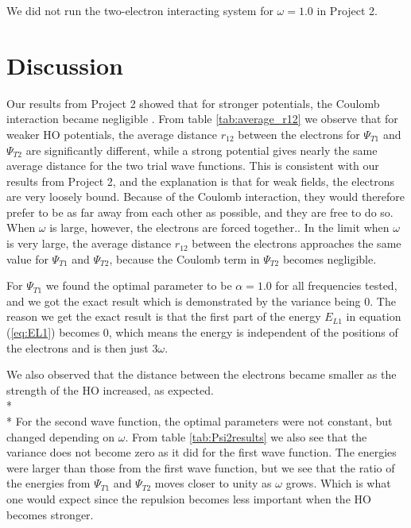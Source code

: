 \documentclass[norsk,a4paper,12pt]{article}
\begin{document}
We did not run the two-electron interacting system for $\omega = 1.0$ in Project 2.

\section{Discussion} \label{Discussion}
Our results from Project 2 showed that for stronger potentials, the Coulomb interaction became negligible \cite{Project_2}. From table \ref{tab:average_r12} we observe that for weaker HO potentials, the average distance $r_{12}$ between the electrons for $\Psi_{T1}$ and $\Psi_{T2}$ are significantly different, while a strong potential gives nearly the same average distance for the two trial wave functions. This is consistent with our results from Project 2, and the explanation is that for weak fields, the electrons are very loosely bound. Because of the Coulomb interaction, they would therefore prefer to be as far away from each other as possible, and they are free to do so. When $\omega$ is large, however, the electrons are forced together.. In the limit when $\omega$ is very large, the average distance $r_{12}$ between the electrons approaches the same value for $\Psi_{T1}$ and $\Psi_{T2}$, because the Coulomb term in $\Psi_{T2}$ becomes negligible.\par 
\vspace{3mm}

For $\Psi_{T1}$ we found the optimal parameter to be $\alpha=1.0$ for all frequencies tested, and we got the exact result which is demonstrated by the variance being $0$. The reason we get the exact result is that the first part of the energy $E_{L1}$ in equation (\ref{eq:EL1}) becomes $0$, which means the energy is independent of the positions of the electrons and is then just $3\omega$. 

We also observed that the distance between the electrons became smaller as the strength of the HO increased, as expected.
\\* \\* \noindent
For the second wave function, the optimal parameters were not constant, but changed depending on $\omega$. From table \ref{tab:Psi2results} we also see that the variance does not become zero as it did for the first wave function. The energies were larger than those from the first wave function, but we see that the ratio of the energies from $\Psi_{T1}$ and $\Psi_{T2}$ moves closer to unity as $\omega$ grows. Which is what one would expect since the repulsion becomes less important when the HO becomes stronger.
\end{document}
